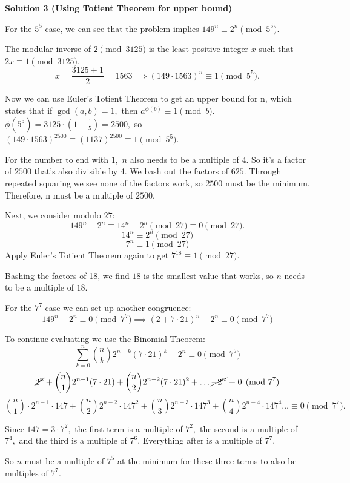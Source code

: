 \begin{enumerate}
 



\textbf{Solution 3 (Using Totient Theorem for upper bound)}

For the $5^5$ case, we can see that the problem implies $149^n \equiv 2^n \pmod{5^5}.$ 

 The modular inverse of $2 \pmod{3125}$ is the least positive integer $x$ such that $2x \equiv 1 \pmod{3125}.$ 
 \[x = \frac{3125 + 1}{2} = 1563 \implies (149\cdot1563)^n \equiv 1 \pmod{5^5}.\]

 Now we can use Euler's Totient Theorem to get an upper bound for n, which states that if $\gcd(a,b) = 1,$ then $a^{\phi(b)} \equiv 1 \pmod{b}.$ $\phi(5^5) = 3125 \cdot (1 - \frac{1}{5}) = 2500,$ so $(149\cdot1563)^{2500} \equiv (1137)^{2500} \equiv 1 \pmod{5^5}.$

 For the number to end with $1,$ $n$ also needs to be a multiple of $4.$ So it's a factor of $2500$ that's also divisible by 4. We bash out the factors of $625.$ Through repeated squaring we see none of the factors work, so $2500$ must be the minimum. Therefore, n must be a multiple of $2500.$

 Next, we consider modulo $27$:
 \[149^n - 2^n \equiv 14^n - 2^n \pmod{27} \equiv 0 \pmod{27}.\]
 \[14^n \equiv 2^n \pmod{27}\] 
 \[7^n \equiv 1 \pmod{27}\] Apply Euler's Totient Theorem again to get $7^{18} \equiv 1 \pmod{27}.$ 

 Bashing the factors of 18, we find $18$ is the smallest value that works, so $n$ needs to be a multiple of $18.$

 For the $7^7$ case we can set up another congruence:
 \[149^n - 2^n \equiv 0 \pmod{7^7} \implies (2 + 7 \cdot 21)^n - 2^n \equiv 0 \pmod{7^7}\]

 To continue evaluating we use the Binomial Theorem:
 \[\sum_{k=0}^{n} \binom{n}{k} 2^{n-k} (7 \cdot 21)^k - 2^n \equiv 0 \pmod{7^7}\]
 \[\cancel{2^n} + \binom{n}{1} 2^{n-1} (7 \cdot 21) + \binom{n}{2} 2^{n-2} (7 \cdot 21)^2 + \dots \cancel{- 2^n} \equiv 0 \pmod{7^7}\]
 \[\binom{n}{1} \cdot 2^{n-1} \cdot 147 + \binom{n}{2} 2^{n-2} \cdot 147^2 + \binom{n}{3} 2^{n-3} \cdot 147^3 + \binom{n}{4} 2^{n-4} \cdot 147^4 \dots \equiv 0 \pmod{7^7}.\]

 Since $147 = 3 \cdot 7^2,$ the first term is a multiple of $7^2,$ the second is a multiple of $7^4,$ and the third is a multiple of $7^6.$ Everything after is a multiple of $7^7.$

 So $n$ must be a multiple of $7^5$ at the minimum for these three terms to also be multiples of $7^7.$


\end{enumerate}
